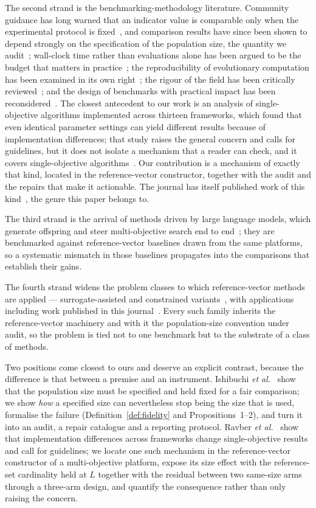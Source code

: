 \documentclass{SCIS2026}
\begin{document}
The second strand is the benchmarking-methodology literature. Community guidance has long warned that an indicator value is comparable only when the experimental protocol is fixed~\cite{15,16}, and comparison results have since been shown to depend strongly on the specification of the population size, the quantity we audit~\cite{9}; wall-clock time rather than evaluations alone has been argued to be the budget that matters in practice~\cite{17}; the reproducibility of evolutionary computation has been examined in its own right~\cite{12}; the rigour of the field has been critically reviewed~\cite{18}; and the design of benchmarks with practical impact has been reconsidered~\cite{19}. The closest antecedent to our work is an analysis of single-objective algorithms implemented across thirteen frameworks, which found that even identical parameter settings can yield different results because of implementation differences; that study raises the general concern and calls for guidelines, but it does not isolate a mechanism that a reader can check, and it covers single-objective algorithms~\cite{10}. Our contribution is a mechanism of exactly that kind, located in the reference-vector constructor, together with the audit and the repairs that make it actionable. The journal has itself published work of this kind~\cite{34}, the genre this paper belongs to.

The third strand is the arrival of methods driven by large language models, which generate offspring and steer multi-objective search end to end~\cite{4,5,6,20}; they are benchmarked against reference-vector baselines drawn from the same platforms, so a systematic mismatch in those baselines propagates into the comparisons that establish their gains.

The fourth strand widens the problem classes to which reference-vector methods are applied --- surrogate-assisted and constrained variants~\cite{21,22,23}, with applications including work published in this journal~\cite{24,25}. Every such family inherits the reference-vector machinery and with it the population-size convention under audit, so the problem is tied not to one benchmark but to the substrate of a class of methods.

Two positions come closest to ours and deserve an explicit contrast, because the difference is that between a premise and an instrument. Ishibuchi \emph{et al.}~\cite{9} show that the population size must be specified and held fixed for a fair comparison; we show \emph{how} a specified size can nevertheless stop being the size that is used, formalise the failure (Definition~\ref{def:fidelity} and Propositions~1--2), and turn it into an audit, a repair catalogue and a reporting protocol. Ravber \emph{et al.}~\cite{10} show that implementation differences across frameworks change single-objective results and call for guidelines; we locate one such mechanism in the reference-vector constructor of a multi-objective platform, expose its size effect with the reference-set cardinality held at $L$ together with the residual between two same-size arms through a three-arm design, and quantify the consequence rather than only raising the concern.
\end{document}
